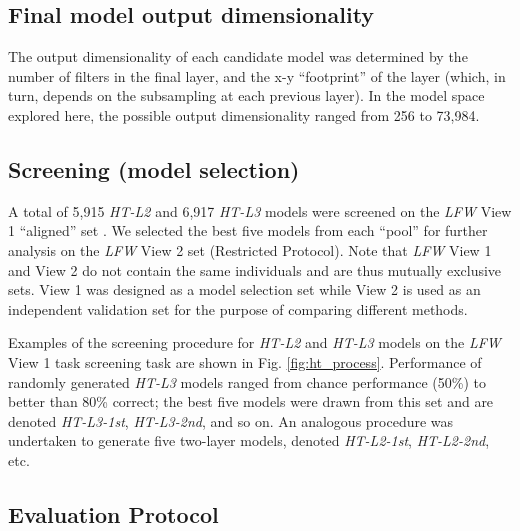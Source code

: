 \subsection{Final model output dimensionality}
\label{sec:final_dim}

The output dimensionality of each candidate model was determined by the number
of filters in the final layer, and the x-y ``footprint'' of the layer (which, in
turn, depends on the subsampling at each previous layer).  In the model space
explored here, the possible output dimensionality ranged from 256 to 73,984.


\subsection{Screening (model selection)}

A total of 5,915 \emph{HT-L2} and 6,917 \emph{HT-L3} models were screened on the \emph{LFW}
View 1 ``aligned'' set \cite{taigman:bmvc09}.  We selected the best five models
from each ``pool'' for further analysis on the \emph{LFW} View 2 set (Restricted
Protocol).  Note that \emph{LFW} View 1 and View 2 do not contain the same
individuals and are thus mutually exclusive sets. View 1 was designed as a model
selection set while View 2 is used as an independent validation set for the
purpose of comparing different methods.

Examples of the screening procedure for \emph{HT-L2} and \emph{HT-L3} models on the
\emph{LFW} View 1 task screening task are shown in Fig. \ref{fig:ht_process}.
Performance of randomly generated \emph{HT-L3} models ranged from chance performance
(50\%) to better than 80\% correct; the best five models were drawn from this
set and are denoted \emph{HT-L3-1st}, \emph{HT-L3-2nd}, and so on.  An analogous
procedure was undertaken to generate five two-layer models, denoted
\emph{HT-L2-1st}, \emph{HT-L2-2nd}, etc.



\subsection{Evaluation Protocol}

